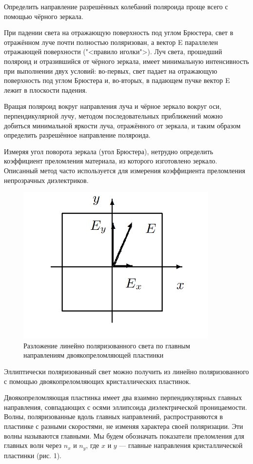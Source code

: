 \documentclass[15pt,a5paper,reqno]{article}
\begin{document}
Определить направление разрешённых колебаний поляроида проще всего с помощью чёрного зеркала.

При падении света на отражающую поверхность под углом Брюстера, свет в отражённом луче почти полностью поляризован, а вектор E
параллелен отражающей поверхности ("<правило иголки">). Луч света,
прошедший поляроид и отразившийся от чёрного зеркала, имеет минимальную интенсивность при выполнении двух условий: во-первых, свет
падает на отражающую поверхность под углом Брюстера и, во-вторых,
в падающем пучке вектор E лежит в плоскости падения.

Вращая поляроид вокруг направления луча и чёрное зеркало вокруг
оси, перпендикулярной лучу, методом последовательных приближений
можно добиться минимальной яркости луча, отражённого от зеркала,
и таким образом определить разрешённое направление поляроида.

Измеряя угол поворота зеркала (угол Брюстера), нетрудно определить коэффициент преломления материала, из которого изготовлено
зеркало. Описанный метод часто используется для измерения коэффициента преломления непрозрачных диэлектриков.



\begin{figure}[h!]
    \centering
    \includegraphics[width=10cm]{pics/1.png}
    \caption{Разложение линейно поляризованного света по главным направлениям двоякопреломляющей пластинки}
    \label{fig:vac}
\end{figure}

Эллиптически поляризованный свет можно получить из линейно поляризованного с
помощью двоякопреломляющих кристаллических пластинок.

Двоякопреломляющая пластинка имеет два взаимно перпендикулярных главных направления, совпадающих с осями эллипсоида диэлектрической проницаемости. Волны, поляризованные вдоль главных направлений, распространяются в пластинке с разными скоростями, не изменяя характера своей поляризации. Эти волны называются главными. Мы будем обозначать показатели преломления для главных волн через $ n_x $ и $ n_y $, где $ x $ и $ y $ --- главные направления кристаллической пластинки (рис. 1).
\end{document}
